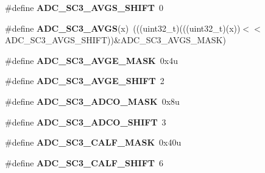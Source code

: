 \begin{DoxyCompactItemize}
\item 
\#define {\bfseries A\+D\+C\+\_\+\+S\+C3\+\_\+\+A\+V\+G\+S\+\_\+\+S\+H\+I\+FT}~0\hypertarget{group__ADC__Register__Masks_gad00e65ae5553df8fbeef6430a61d2f74}{}\label{group__ADC__Register__Masks_gad00e65ae5553df8fbeef6430a61d2f74}

\item 
\#define {\bfseries A\+D\+C\+\_\+\+S\+C3\+\_\+\+A\+V\+GS}(x)~(((uint32\+\_\+t)(((uint32\+\_\+t)(x))$<$$<$A\+D\+C\+\_\+\+S\+C3\+\_\+\+A\+V\+G\+S\+\_\+\+S\+H\+I\+FT))\&A\+D\+C\+\_\+\+S\+C3\+\_\+\+A\+V\+G\+S\+\_\+\+M\+A\+SK)\hypertarget{group__ADC__Register__Masks_gac693b130e0a9400fe61d0a23f5d59780}{}\label{group__ADC__Register__Masks_gac693b130e0a9400fe61d0a23f5d59780}

\item 
\#define {\bfseries A\+D\+C\+\_\+\+S\+C3\+\_\+\+A\+V\+G\+E\+\_\+\+M\+A\+SK}~0x4u\hypertarget{group__ADC__Register__Masks_gafcb3a8cfe1a126545673ddcf733b74da}{}\label{group__ADC__Register__Masks_gafcb3a8cfe1a126545673ddcf733b74da}

\item 
\#define {\bfseries A\+D\+C\+\_\+\+S\+C3\+\_\+\+A\+V\+G\+E\+\_\+\+S\+H\+I\+FT}~2\hypertarget{group__ADC__Register__Masks_ga56d9621785ea853cf450f1b06d15e1d5}{}\label{group__ADC__Register__Masks_ga56d9621785ea853cf450f1b06d15e1d5}

\item 
\#define {\bfseries A\+D\+C\+\_\+\+S\+C3\+\_\+\+A\+D\+C\+O\+\_\+\+M\+A\+SK}~0x8u\hypertarget{group__ADC__Register__Masks_ga9054cd805b818a928ca4309c717466db}{}\label{group__ADC__Register__Masks_ga9054cd805b818a928ca4309c717466db}

\item 
\#define {\bfseries A\+D\+C\+\_\+\+S\+C3\+\_\+\+A\+D\+C\+O\+\_\+\+S\+H\+I\+FT}~3\hypertarget{group__ADC__Register__Masks_ga8e5f5e3a1378880d2a03d1662f39c308}{}\label{group__ADC__Register__Masks_ga8e5f5e3a1378880d2a03d1662f39c308}

\item 
\#define {\bfseries A\+D\+C\+\_\+\+S\+C3\+\_\+\+C\+A\+L\+F\+\_\+\+M\+A\+SK}~0x40u\hypertarget{group__ADC__Register__Masks_ga3a706436447b6113727826e303c3fbe6}{}\label{group__ADC__Register__Masks_ga3a706436447b6113727826e303c3fbe6}

\item 
\#define {\bfseries A\+D\+C\+\_\+\+S\+C3\+\_\+\+C\+A\+L\+F\+\_\+\+S\+H\+I\+FT}~6\hypertarget{group__ADC__Register__Masks_ga9fd60a35fc4c15b563078ecbd3eaa449}{}\label{group__ADC__Register__Masks_ga9fd60a35fc4c15b563078ecbd3eaa449}


\end{DoxyCompactItemize}
